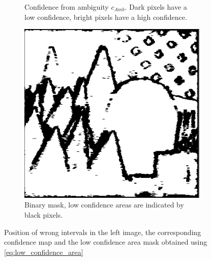 \begin{figure}
\begin{subfigure}[t]{0.3\linewidth}
        \caption{Confidence from ambiguity $c_{Amb}$. Dark pixels have a low confidence, bright pixels have a high confidence.}
        \label{fig:ambiguity_cones}
    \end{subfigure}\hfill
    \begin{subfigure}[t]{0.3\linewidth}
        \centering
        \includegraphics[width=\linewidth]{Images/Chap_5/ambiguity_mask_cones.png}
        \caption{Binary mask, low confidence areas are indicated by black pixels.}
        \label{fig:ambiguity_mask_cones}
    \end{subfigure}
    \caption{Position of wrong intervals in the left image, the corresponding confidence map and the low confidence area mask obtained using \cref{eq:low_confidence_area}}
    \label{fig:wrong_intervals_and_ambiguity}
\end{figure}

